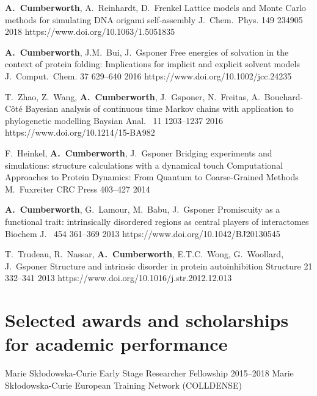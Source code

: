 \documentclass[10pt]{article}
\begin{document}
\journal
    {\textbf{A.~Cumberworth}, A.~Reinhardt, D.~Frenkel}
    {Lattice models and Monte Carlo methods for simulating DNA origami self-assembly}
    {J.~Chem.~Phys.}
    {149}
    {234905}
    {2018}
    {https://www.doi.org/10.1063/1.5051835}
    \vspace{0.3cm}

\journal
    {\textbf{A.~Cumberworth}, J.M.~Bui, J.~Gsponer}
    {Free energies of solvation in the context of protein folding: Implications for implicit and explicit solvent models}
    {J.~Comput.~Chem.}
    {37}
    {629--640}
    {2016}
    {https://www.doi.org/10.1002/jcc.24235}
    \vspace{0.3cm}

\journal
    {T.~Zhao, Z.~Wang, \textbf{A.~Cumberworth}, J.~Gsponer, N.~Freitas, A.~Bouchard-Côté}
    {Bayesian analysis of continuous time Markov chains with application to phylogenetic modelling}
    {Baysian Anal.~}
    {11}
    {1203--1237}
    {2016}
    {https://www.doi.org/10.1214/15-BA982}
    \vspace{0.3cm}

\book
    {F.~Heinkel, \textbf{A.~Cumberworth}, J.~Gsponer}
    {Bridging experiments and simulations: structure calculations with a dynamical touch}
    {Computational Approaches to Protein Dynamics: From Quantum to Coarse-Grained Methods}
    {M.~Fuxreiter}
    {CRC Press}
    {403--427}
    {2014}
    \vspace{0.3cm}

\journal
    {\textbf{A.~Cumberworth}, G.~Lamour, M.~Babu, J.~Gsponer}
    {Promiscuity as a functional trait: intrinsically disordered regions as central players of interactomes}
    {Biochem J.~}
    {454}
    {361--369}
    {2013}
    {https://www.doi.org/10.1042/BJ20130545}
    \vspace{0.3cm}

\journal
    {T.~Trudeau, R.~Nassar, \textbf{A.~Cumberworth}, E.T.C.~Wong, G.~Woollard, J.~Gsponer}
    {Structure and intrinsic disorder in protein autoinhibition}
    {Structure}
    {21}
    {332--341}
    {2013}
    {https://www.doi.org/10.1016/j.str.2012.12.013}

\section{Selected awards and scholarships for academic performance}
\vspace{-0.2cm}

\award
    {Marie Skłodowska-Curie Early Stage Researcher Fellowship}
    {2015--2018}
    {Marie Skłodowska-Curie European Training Network (COLLDENSE)}
\end{document}
